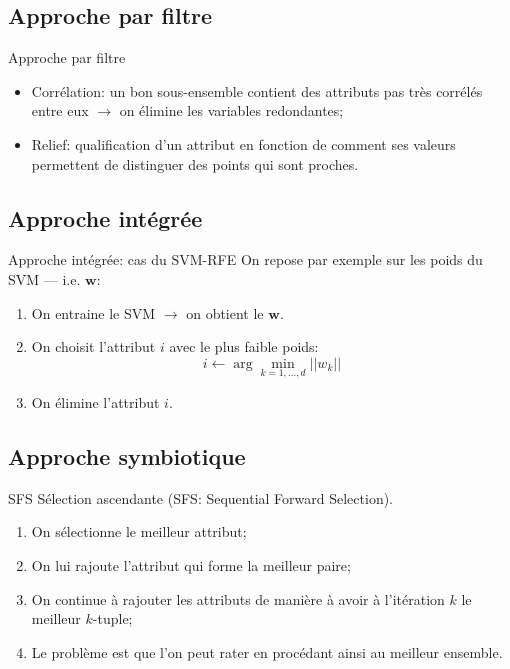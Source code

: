 \documentclass[8pt]{beamer}
\begin{document}
	\subsection[filter approach]{Approche par filtre}
	\begin{frame}{Approche par filtre}
		\begin{itemize}
			\item  Corrélation: un bon sous-ensemble contient des attributs pas très corrélés entre eux $\longrightarrow$ on élimine les variables redondantes;
			\item  Relief: qualification d'un attribut en fonction de comment ses valeurs permettent de distinguer des points qui sont proches.
		\end{itemize}
	\end{frame}

	\subsection[integrated approach]{Approche intégrée}
	\begin{frame}{Approche intégrée: cas du SVM-RFE}
		On repose par exemple sur les poids du SVM --- i.e.  $ \textbf{w}$:
		\begin{enumerate}
			\item<1-> On entraine le SVM $\longrightarrow$ on obtient le $\textbf{w}$.
			\item<2-> On choisit l'attribut $i$ avec le plus faible poids:
			$$ i \leftarrow \arg \min_{k=1,\dots,d}{\vert\vert w_k\vert\vert}$$
			\item<3-> On élimine l'attribut $i$.
		\end{enumerate}
	\end{frame}

	\subsection[symbiotic approach]{Approche symbiotique}
	\begin{frame}{SFS}
		Sélection ascendante (SFS\@: Sequential Forward Selection).
		\begin{enumerate}
		\item<1-> On sélectionne le meilleur attribut;
		\item<2-> On lui rajoute l'attribut qui forme la meilleur paire;
		\item<3-> On continue à rajouter les attributs de manière à avoir à l'itération $k$ le meilleur $k$-tuple;
		\item <4-> Le problème est que l'on peut rater en procédant ainsi au meilleur ensemble.
		\end{enumerate}
	\end{frame}
\end{document}
